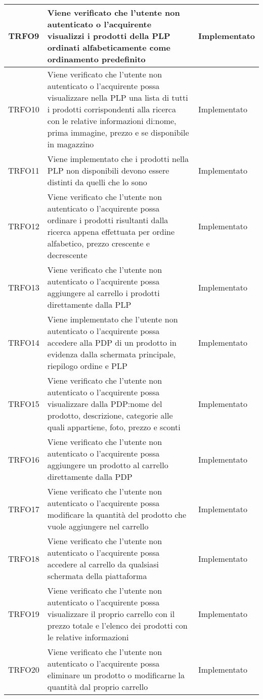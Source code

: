 \begin{longtable}{|c| C{10cm} |C{3cm}|}
	TRFO9 & Viene verificato che l'utente non autenticato o l'acquirente visualizzi i prodotti della PLP ordinati alfabeticamente come ordinamento predefinito & Implementato\\ \hline
	TRFO10 & Viene verificato che l'utente non autenticato o l'acquirente possa visualizzare nella PLP una lista di tutti i prodotti corrispondenti alla ricerca con le relative informazioni di:nome, prima immagine, prezzo e se disponibile in magazzino & Implementato \\ \hline
	TRFO11 & Viene implementato che i prodotti nella PLP non disponibili devono essere distinti da quelli che lo sono & Implementato \\ \hline
	TRFO12 & Viene verificato che l'utente non autenticato o l'acquirente possa ordinare i prodotti risultanti dalla ricerca appena effettuata per ordine alfabetico, prezzo crescente e decrescente & Implementato \\ \hline
	TRFO13 & Viene verificato che l'utente non autenticato o l'acquirente possa aggiungere al carrello i prodotti direttamente dalla PLP & Implementato\\ \hline
	TRFO14 & Viene implementato che l'utente non autenticato o l'acquirente possa accedere alla PDP di un prodotto in evidenza dalla schermata principale, riepilogo ordine e PLP & Implementato \\ \hline
	TRFO15 & Viene verificato che l'utente non autenticato o l'acquirente possa visualizzare dalla PDP:nome del prodotto, descrizione, categorie alle quali appartiene, foto, prezzo e sconti & Implementato \\ \hline
	TRFO16 & Viene verificato che l'utente non autenticato o l'acquirente possa aggiungere un prodotto al carrello direttamente dalla PDP  & Implementato\\ \hline
	TRFO17 & Viene verificato che l'utente non autenticato o l'acquirente possa modificare la quantità del prodotto che vuole aggiungere nel carrello & Implementato\\ \hline
	TRFO18 & Viene verificato che l'utente non autenticato o l'acquirente possa accedere al carrello da qualsiasi schermata della piattaforma & Implementato \\ \hline
     TRFO19 & Viene verificato che l'utente non autenticato o l'acquirente possa visualizzare il proprio carrello con il prezzo totale e l'elenco dei prodotti con le relative informazioni & Implementato\\ \hline
   	TRFO20 & Viene verificato che l'utente non autenticato o l'acquirente possa eliminare un prodotto o modificarne la quantità dal proprio carrello & Implementato\\ \hline

\end{longtable}
